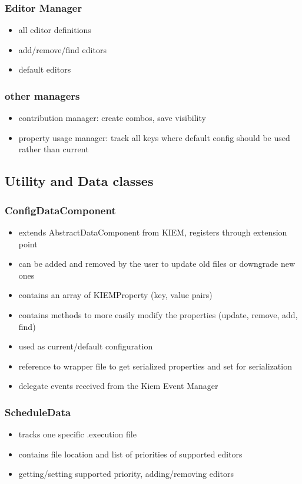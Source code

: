 \subsubsection{Editor Manager}
\begin{itemize}
 \item all editor definitions
 \item add/remove/find editors
 \item default editors 
\end{itemize}

\subsubsection{other managers}
\begin{itemize}
 \item contribution manager: create combos, save visibility
 \item property usage manager: track all keys where default config should be used rather than current
\end{itemize}

\subsection{Utility and Data classes}

\subsubsection{ConfigDataComponent}
\begin{itemize}
 \item extends AbstractDataComponent from KIEM, registers through extension point
 \item can be added and removed by the user to update old files or downgrade new ones
 \item contains an array of KIEMProperty (key, value pairs)
 \item contains methods to more easily modify the properties (update, remove, add, find)
 \item used as current/default configuration
 \item reference to wrapper file to get serialized properties and set for serialization
 \item delegate events received from the Kiem Event Manager
\end{itemize}

\subsubsection{ScheduleData}
\begin{itemize}
 \item tracks one specific .execution file
 \item contains file location and list of priorities of supported editors
 \item getting/setting supported priority, adding/removing editors
\end{itemize}

